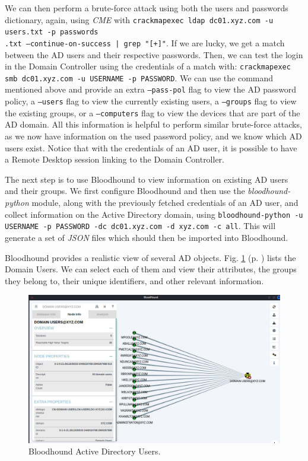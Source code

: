 We can then perform a brute-force attack using both the users and passwords dictionary, again, using \textit{CME} with \texttt{crackmapexec ldap dc01.xyz.com -u users.txt -p passwords\\.txt ---continue-on-success | grep "[+]"}. If we are lucky, we get a match between the AD users and their respective passwords. Then, we can test the login in the Domain Controller using the credentials of a match with: \texttt{crackmapexec smb dc01.xyz.com -u USERNAME -p PASSWORD}. We can use the command mentioned above and provide an extra \texttt{---pass-pol} flag to view the AD password policy, a \texttt{---users} flag to view the currently existing users, a \texttt{---groups} flag to view the existing groups, or a \texttt{---computers} flag to view the devices that are part of the AD domain. All this information is helpful to perform similar brute-force attacks, as we now have information on the used password policy, and we know which AD users exist. Notice that with the credentials of an AD user, it is possible to have a Remote Desktop session linking to the Domain Controller.

The next step is to use Bloodhound to view information on existing AD users and their groups. We first configure Bloodhound and then use the \textit{bloodhound-python} module, along with the previously fetched credentials of an AD user, and collect information on the Active Directory domain, using \texttt{bloodhound-python -u USERNAME -p PASSWORD -dc dc01.xyz.com -d xyz.com -c all}. This will generate a set of \textit{JSON} files which should then be imported into Bloodhound.

Bloodhound provides a realistic view of several AD objects. Fig. \ref{fig:bloodhound_ad_users} (p. \pageref{fig:bloodhound_ad_users}) lists the Domain Users. We can select each of them and view their attributes, the groups they belong to, their unique identifiers, and other relevant information.

\begin{figure}[H]
    \includegraphics[width=12cm]{figures/bloodhound_ad_users.png}
    \caption{Bloodhound Active Directory Users.}
    \label{fig:bloodhound_ad_users}
\end{figure}

